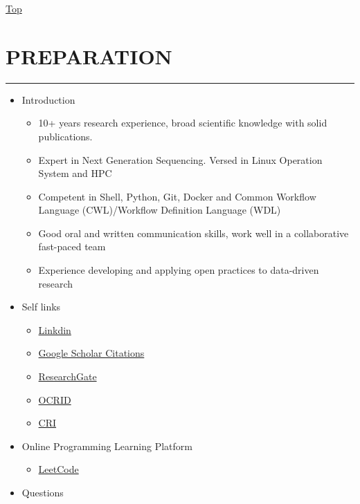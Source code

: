 \documentclass[]{article}
\providecommand{\tightlist}{%
  \setlength{\itemsep}{0pt}\setlength{\parskip}{0pt}}
\begin{document}
\protect\hyperlink{Top}{Top}

\newpage

\section{PREPARATION}\label{preparation}

\begin{center}\rule{0.5\linewidth}{\linethickness}\end{center}

\begin{itemize}
\tightlist
\item
  Introduction

  \begin{itemize}
  \tightlist
  \item
    10+ years research experience, broad scientific knowledge with solid
    publications.
  \item
    Expert in Next Generation Sequencing. Versed in Linux Operation
    System and HPC
  \item
    Competent in Shell, Python, Git, Docker and Common Workflow Language
    (CWL)/Workflow Definition Language (WDL) 
  \item
    Good oral and written communication skills, work well in a
    collaborative fast-paced team
  \item
    Experience developing and applying open practices to data-driven
    research
  \end{itemize}
\item
  Self links

  \begin{itemize}
  \tightlist
  \item
    \href{https://www.linkedin.com/in/wen-ching-chan-350ab654/}{Linkdin}
  \item
    \href{https://scholar.google.com/citations?user=rE6CbgIAAAAJ}{Google
    Scholar Citations}
  \item
    \href{https://www.researchgate.net/profile/Wen-Ching_Chan/}{ResearchGate}
  \item
    \href{http://orcid.org/0000-0003-0034-7277}{OCRID}
  \item
    \href{http://cri.uchicago.edu/people/\#chan}{CRI}
  \end{itemize}
\item
  Online Programming Learning Platform

  \begin{itemize}
  \tightlist
  \item
    \href{https://leetcode.com/}{LeetCode}
  \end{itemize}
\item
  Questions


\end{itemize}
\end{document}
